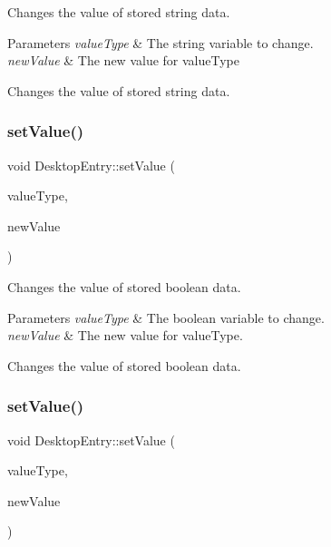 Changes the value of stored string data.


\begin{DoxyParams}{Parameters}
{\em value\+Type} & The string variable to change.\\
\hline
{\em new\+Value} & The new value for value\+Type\\
\hline
\end{DoxyParams}
Changes the value of stored string data. \mbox{\label{classDesktopEntry_abd979bd46d7c4ff297bd8a78a90430ba}} 
\subsubsection{\texorpdfstring{set\+Value()}{setValue()}\hspace{0.1cm}{\footnotesize\ttfamily [2/3]}}
{\footnotesize\ttfamily void Desktop\+Entry\+::set\+Value (\begin{DoxyParamCaption}\item[{\mbox{\hyperlink{classDesktopEntry_ae44a005f0d494b8aeb422ec165517b60}{Bool\+Value}}}]{value\+Type,  }\item[{bool}]{new\+Value }\end{DoxyParamCaption})}

Changes the value of stored boolean data.


\begin{DoxyParams}{Parameters}
{\em value\+Type} & The boolean variable to change.\\
\hline
{\em new\+Value} & The new value for value\+Type.\\
\hline
\end{DoxyParams}
Changes the value of stored boolean data. \mbox{\label{classDesktopEntry_a4e3922949b91b3c3944d8c70b2250634}} 
\subsubsection{\texorpdfstring{set\+Value()}{setValue()}\hspace{0.1cm}{\footnotesize\ttfamily [3/3]}}
{\footnotesize\ttfamily void Desktop\+Entry\+::set\+Value (\begin{DoxyParamCaption}\item[{\mbox{\hyperlink{classDesktopEntry_a1b40a3ef9c679a58d3f065d2d183cad0}{List\+Value}}}]{value\+Type,  }\item[{String\+Array}]{new\+Value }\end{DoxyParamCaption})}

